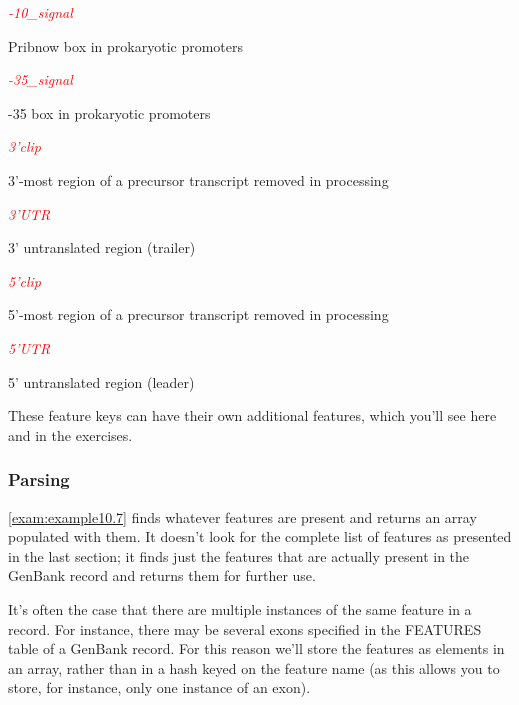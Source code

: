 \textcolor{red}{\textit{-10\_signal}}
\begin{adjustwidth}{2em}{}
Pribnow box in prokaryotic promoters
\end{adjustwidth}

\textcolor{red}{\textit{-35\_signal}}
\begin{adjustwidth}{2em}{}
-35 box in prokaryotic promoters
\end{adjustwidth}

\textcolor{red}{\textit{3'clip}}
\begin{adjustwidth}{2em}{}
3'-most region of a precursor transcript removed in processing
\end{adjustwidth}

\textcolor{red}{\textit{3'UTR}}
\begin{adjustwidth}{2em}{}
3' untranslated region (trailer)
\end{adjustwidth}

\textcolor{red}{\textit{5'clip}}
\begin{adjustwidth}{2em}{}
5'-most region of a precursor transcript removed in processing
\end{adjustwidth}

\textcolor{red}{\textit{5'UTR}}
\begin{adjustwidth}{2em}{}
5' untranslated region (leader)
\end{adjustwidth}

These feature keys can have their own additional features, which you'll see here and in the exercises.

\subsubsection{Parsing}
\autoref{exam:example10.7} finds whatever features are present and returns an array populated with them. It doesn't look for the complete list of features as presented in the last section; it finds just the features that are actually present in the GenBank record and returns them for further use.

It's often the case that there are multiple instances of the same feature in a record. For instance, there may be several exons specified in the FEATURES table of a GenBank record. For this reason we'll store the features as elements in an array, rather than in a hash keyed on the feature name (as this allows you to store, for instance, only one instance of an exon).




